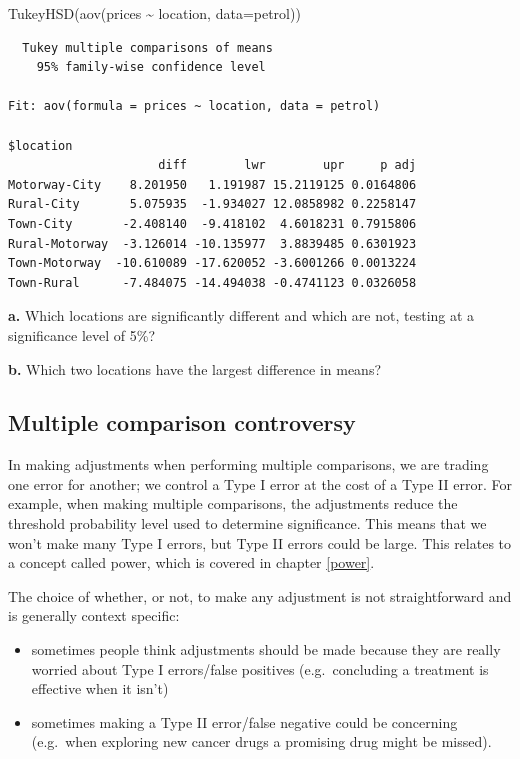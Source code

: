 \documentclass[
  oneside]{krantz}
\newenvironment{Shaded}{\begin{snugshade}}{\end{snugshade}}
\newcommand{\AttributeTok}[1]{\textcolor[rgb]{0.77,0.63,0.00}{#1}}
\newcommand{\FunctionTok}[1]{\textcolor[rgb]{0.00,0.00,0.00}{#1}}
\newcommand{\NormalTok}[1]{#1}
\newcommand{\SpecialCharTok}[1]{\textcolor[rgb]{0.00,0.00,0.00}{#1}}
\providecommand{\tightlist}{%
  \setlength{\itemsep}{0pt}\setlength{\parskip}{0pt}}
\begin{document}
\begin{Shaded}
\begin{Highlighting}[]
\FunctionTok{TukeyHSD}\NormalTok{(}\FunctionTok{aov}\NormalTok{(prices }\SpecialCharTok{\textasciitilde{}}\NormalTok{ location, }\AttributeTok{data=}\NormalTok{petrol))}
\end{Highlighting}
\end{Shaded}

\begin{verbatim}
  Tukey multiple comparisons of means
    95% family-wise confidence level

Fit: aov(formula = prices ~ location, data = petrol)

$location
                     diff        lwr        upr     p adj
Motorway-City    8.201950   1.191987 15.2119125 0.0164806
Rural-City       5.075935  -1.934027 12.0858982 0.2258147
Town-City       -2.408140  -9.418102  4.6018231 0.7915806
Rural-Motorway  -3.126014 -10.135977  3.8839485 0.6301923
Town-Motorway  -10.610089 -17.620052 -3.6001266 0.0013224
Town-Rural      -7.484075 -14.494038 -0.4741123 0.0326058
\end{verbatim}

\textbf{a.} Which locations are significantly different and which are not, testing at a significance level of 5\%?

\textbf{b.} Which two locations have the largest difference in means?

\hypertarget{multiple-comparison-controversy}{%
\subsection{Multiple comparison controversy}\label{multiple-comparison-controversy}}

In making adjustments when performing multiple comparisons, we are trading one error for another; we control a Type I error at the cost of a Type II error. For example, when making multiple comparisons, the adjustments reduce the threshold probability level used to determine significance. This means that we won't make many Type I errors, but Type II errors could be large. This relates to a concept called power, which is covered in chapter \ref{power}.

The choice of whether, or not, to make any adjustment is not straightforward and is generally context specific:

\begin{itemize}
\tightlist
\item
  sometimes people think adjustments should be made because they are really worried about Type I errors/false positives (e.g.~concluding a treatment is effective when it isn't)
\item
  sometimes making a Type II error/false negative could be concerning (e.g.~when exploring new cancer drugs a promising drug might be missed).
\end{itemize}
\end{document}

